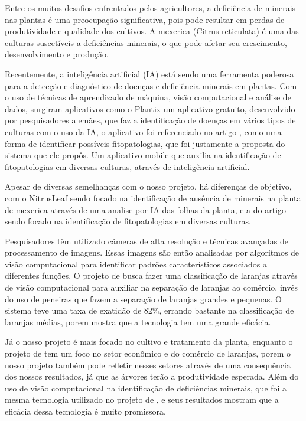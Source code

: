 Entre os muitos desafios enfrentados pelos agricultores, a deficiência de minerais nas plantas é uma preocupação significativa, pois pode resultar em perdas de produtividade e qualidade dos cultivos. A mexerica (Citrus reticulata) é uma das culturas suscetíveis a deficiências minerais, o que pode afetar seu crescimento, desenvolvimento e produção.

Recentemente, a inteligência artificial (IA) está sendo uma ferramenta poderosa para a detecção e diagnóstico de doenças e deficiência minerais em plantas. Com o uso de técnicas de aprendizado de máquina, visão computacional e análise de dados, surgiram aplicativos como o Plantix um aplicativo gratuito, desenvolvido por pesquisadores alemães, que faz a identificação de doenças em vários tipos de culturas com o uso da IA, o aplicativo foi referenciado no artigo \textcite{EstadoArte1}, como uma forma de identificar possíveis fitopatologias, que foi justamente a proposta do sistema que ele propôs. Um aplicativo mobile que auxilia na identificação de fitopatologias em diversas culturas, através de inteligência artificial.

Apesar de diversas semelhanças com o nosso projeto, há diferenças de objetivo, com o NitrusLeaf sendo focado na identificação de ausência de minerais na planta de mexerica através de uma analise por IA das folhas da planta, e a do artigo \textcite{EstadoArte1} sendo focado na identificação de fitopatologias em diversas culturas.

Pesquisadores têm utilizado câmeras de alta resolução e técnicas avançadas de processamento de imagens. Essas imagens são então analisadas por algoritmos de visão computacional para identificar padrões característicos associados a diferentes funções. O projeto de \textcite{EstadoArte2} busca fazer uma classificação de laranjas através de visão computacional para auxiliar na separação de laranjas ao comércio, invés do uso de peneiras que fazem a separação de laranjas grandes e pequenas. O sistema teve uma taxa de exatidão de 82\%, errando bastante na classificação de laranjas médias, porem mostra que a tecnologia tem uma grande eficácia. 

Já o nosso projeto é mais focado no cultivo e tratamento da planta, enquanto o projeto de \textcite{EstadoArte2} tem um foco no setor econômico e do comércio de laranjas, porem o nosso projeto também pode refletir nesses setores através de uma consequência dos nossos resultados, já que as árvores terão a produtividade esperada. Além do uso de visão computacional na identificação de deficiências minerais, que foi a mesma tecnologia utilizado no projeto de \textcite{EstadoArte2}, e seus resultados mostram que a eficácia dessa tecnologia é muito promissora.

